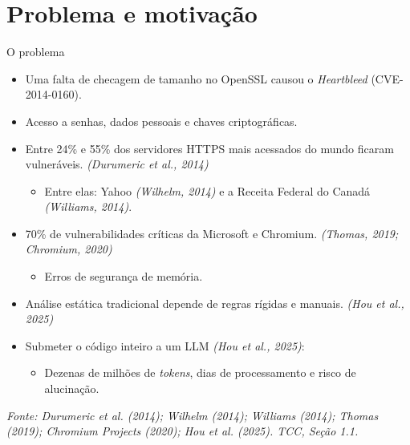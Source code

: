 \documentclass[
    aspectratio=169,
    12pt,
    brazil
]{beamer}
\newcommand{\fonte}[1]{{\tiny\itshape Fonte: #1\par}}
\newcommand{\cit}[1]{{\scriptsize\itshape (#1)}}
\begin{document}
\section{Problema e motivação}
\begin{frame}{O problema}
  \footnotesize
  \begin{itemize}
    \item Uma falta de checagem de tamanho no OpenSSL causou o \textit{Heartbleed} (CVE-2014-0160).
    \item Acesso a senhas, dados pessoais e chaves criptográficas.
    \item Entre 24\% e 55\% dos servidores HTTPS mais acessados do mundo ficaram vulneráveis. \cit{Durumeric et al., 2014}
    \begin{itemize} 
      \item Entre elas: Yahoo \cit{Wilhelm, 2014} e a Receita Federal do Canadá \cit{Williams, 2014}.
    \end{itemize}
    \item 70\% de vulnerabilidades críticas da Microsoft e Chromium. \cit{Thomas, 2019; Chromium, 2020}
    \begin{itemize}
      \item Erros de segurança de memória. 
    \end{itemize}
    \item Análise estática tradicional depende de regras rígidas e manuais. \cit{Hou et al., 2025}
    \item Submeter o código inteiro a um LLM \cit{Hou et al., 2025}: 
    \begin{itemize}
      \item Dezenas de milhões de \textit{tokens}, dias de processamento e risco de alucinação.
    \end{itemize}
  \end{itemize}
  \vfill
  \fonte{Durumeric et al. (2014); Wilhelm (2014); Williams (2014); Thomas (2019); Chromium Projects (2020); Hou et al. (2025). TCC, Seção 1.1.}
\end{frame}

\end{document}
